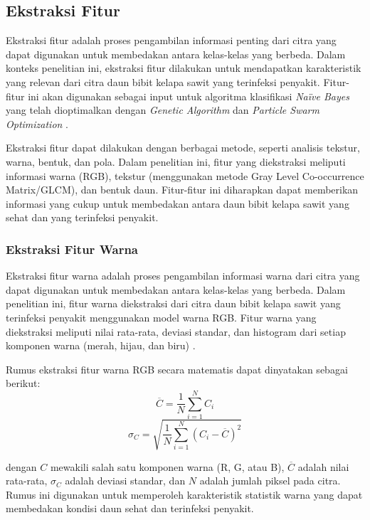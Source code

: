 \subsection{Ekstraksi Fitur} \label{II.Ekstraksi Fitur}
Ekstraksi fitur adalah proses pengambilan informasi penting dari citra yang dapat digunakan untuk membedakan antara kelas-kelas yang berbeda. Dalam konteks penelitian ini, ekstraksi fitur dilakukan untuk mendapatkan karakteristik yang relevan dari citra daun bibit kelapa sawit yang terinfeksi penyakit. Fitur-fitur ini akan digunakan sebagai input untuk algoritma klasifikasi \textit{Naïve Bayes} yang telah dioptimalkan dengan \textit{Genetic Algorithm} dan \textit{Particle Swarm Optimization} \cite{alwy2023klasifikasi}.

Ekstraksi fitur dapat dilakukan dengan berbagai metode, seperti analisis tekstur, warna, bentuk, dan pola. Dalam penelitian ini, fitur yang diekstraksi meliputi informasi warna (RGB), tekstur (menggunakan metode Gray Level Co-occurrence Matrix/GLCM), dan bentuk daun. Fitur-fitur ini diharapkan dapat memberikan informasi yang cukup untuk membedakan antara daun bibit kelapa sawit yang sehat dan yang terinfeksi penyakit.

\subsubsection{Ekstraksi Fitur Warna} \label{II.Ekstraksi Fitur Warna}
Ekstraksi fitur warna adalah proses pengambilan informasi warna dari citra yang dapat digunakan untuk membedakan antara kelas-kelas yang berbeda. Dalam penelitian ini, fitur warna diekstraksi dari citra daun bibit kelapa sawit yang terinfeksi penyakit menggunakan model warna RGB. Fitur warna yang diekstraksi meliputi nilai rata-rata, deviasi standar, dan histogram dari setiap komponen warna (merah, hijau, dan biru) \cite{yohannes2023klasifikasi}.

Rumus ekstraksi fitur warna RGB secara matematis dapat dinyatakan sebagai berikut:
\begin{equation}
	\overline{C} = \frac{1}{N} \sum_{i=1}^{N} C_i \label{eq:mean-color}
\end{equation}
\begin{equation}
	\sigma_C = \sqrt{ \frac{1}{N} \sum_{i=1}^{N} (C_i - \overline{C})^2 } \label{eq:std-color}
\end{equation}


\noindent
dengan $C$ mewakili salah satu komponen warna (R, G, atau B), $\overline{C}$ adalah nilai rata-rata, $\sigma_C$ adalah deviasi standar, dan $N$ adalah jumlah piksel pada citra. Rumus ini digunakan untuk memperoleh karakteristik statistik warna yang dapat membedakan kondisi daun sehat dan terinfeksi penyakit.

